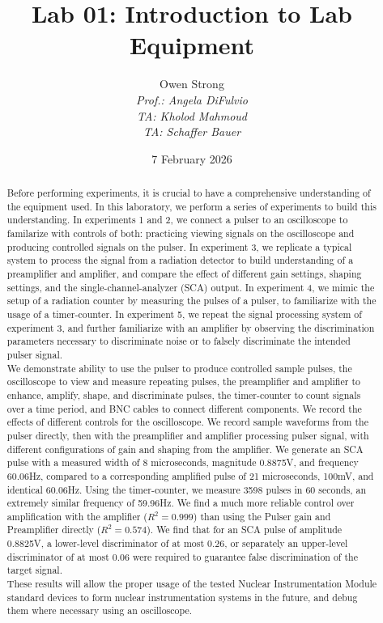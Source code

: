 \documentclass[12pt]{article}
\title{Lab 01: Introduction to Lab Equipment
}
\author{Owen Strong \\
\itshape Prof.: Angela DiFulvio\\
\itshape TA: Kholod Mahmoud \\
\itshape TA: Schaffer Bauer \\
}
\date{7 February 2026}
\begin{document}
\maketitle
\begin{abstract}
    Before performing experiments, it is crucial to have a comprehensive understanding of the equipment used. 
    In this laboratory, we perform a series of experiments to build this understanding. 
    In experiments 1 and 2, we connect a pulser to an oscilloscope to familarize with controls of both: practicing viewing signals on the oscilloscope and producing controlled signals on the pulser.
    In experiment 3, we replicate  a typical system to process the signal from a radiation detector to build understanding of a preamplifier and amplifier, and compare the effect of different gain settings, shaping settings, and the single-channel-analyzer (SCA) output.
    In experiment 4, we mimic the setup of a radiation counter by measuring the pulses of a pulser, to familiarize with the usage of a timer-counter.
    In experiment 5, we repeat the signal processing system of experiment 3, and further familiarize with an amplifier by observing the discrimination parameters necessary to discriminate noise or to falsely discriminate the intended pulser signal.\\

    We demonstrate ability to use the pulser to produce controlled sample pulses, the oscilloscope to view and measure repeating pulses, the preamplifier and amplifier to enhance, amplify, shape, and discriminate pulses, the timer-counter to count signals over a time period, and BNC cables to connect different components.
    We record the effects of different controls for the oscilloscope.
    We record sample waveforms from the pulser directly, then with the preamplifier and amplifier processing pulser signal, with different configurations of gain and shaping from the amplifier.
    We generate an SCA pulse with a measured width of 8 microseconds, magnitude 0.8875V, and frequency 60.06Hz, compared to a corresponding amplified pulse of 21 microseconds, 100mV, and identical 60.06Hz.
    Using the timer-counter, we measure 3598 pulses in 60 seconds, an extremely similar frequency of 59.96Hz.
    We find a much more reliable control over amplification with the amplifier ($R^2=0.999$) than using the Pulser gain and Preamplifier directly ($R^2=0.574$).
    We find that for an SCA pulse of amplitude 0.8825V, a lower-level discriminator of at most 0.26, or separately an upper-level discriminator of at most 0.06 were required to guarantee false discrimination of the target signal.\\

    These results will allow the proper usage of the tested Nuclear Instrumentation Module standard devices to form nuclear instrumentation systems in the future, and debug them where necessary using an oscilloscope.
\end{abstract}
\end{document}
